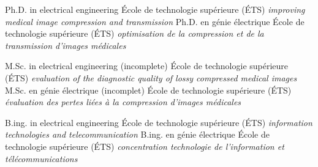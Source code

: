 \documentclass[print]{friggeri-cv}
\begin{document}
\begin{entrylist}
  \engfr
  { {Ph.D. in electrical engineering} {École de technologie supérieure {\scriptsize (ÉTS)}} {\emph{improving medical image compression and transmission}}}
  { {Ph.D. en génie électrique} {École de technologie supérieure {\scriptsize (ÉTS)}} {\emph{optimisation de la compression et de la transmission d'images médicales}}}

  \engfr
  { {M.Sc. in electrical engineering (incomplete\textsuperscript{\tiny\textdaggerdbl})} {École de technologie supérieure {\scriptsize (ÉTS)}} {\emph{evaluation of the diagnostic quality of lossy compressed medical images}}}
  { {M.Sc. en génie électrique (incomplet\textsuperscript{\tiny\textdaggerdbl})} {École de technologie supérieure {\scriptsize (ÉTS)}} {\emph{évaluation des pertes liées à la compression d'images médicales}}}

  \engfr
  { {B.ing. in electrical engineering} {École de technologie supérieure {\scriptsize (ÉTS)}} {\emph{information technologies and telecommunication}}}
  { {B.ing. en génie électrique} {École de technologie supérieure {\scriptsize (ÉTS)}} {\emph{concentration technologie de l'information et télécommunications}}}

\end{entrylist}


\end{document}
